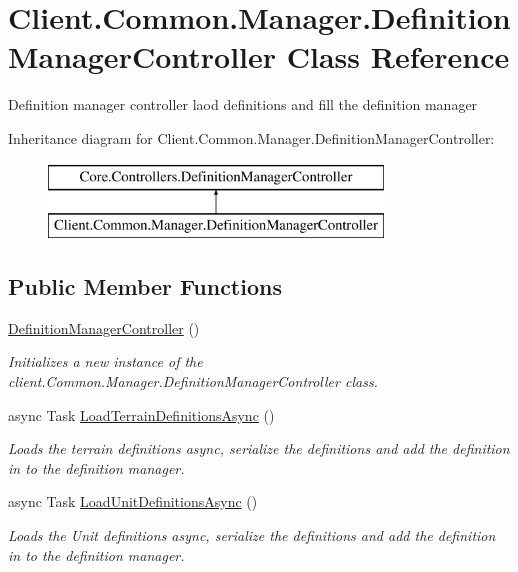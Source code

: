 \hypertarget{classClient_1_1Common_1_1Manager_1_1DefinitionManagerController}{\section{Client.\-Common.\-Manager.\-Definition\-Manager\-Controller Class Reference}
\label{classClient_1_1Common_1_1Manager_1_1DefinitionManagerController}
}


Definition manager controller laod definitions and fill the definition manager  


Inheritance diagram for Client.\-Common.\-Manager.\-Definition\-Manager\-Controller\-:\begin{figure}[H]
\begin{center}
\leavevmode
\includegraphics[height=2.000000cm]{classClient_1_1Common_1_1Manager_1_1DefinitionManagerController}
\end{center}
\end{figure}
\subsection*{Public Member Functions}
\begin{DoxyCompactItemize}
\item 
\hyperlink{classClient_1_1Common_1_1Manager_1_1DefinitionManagerController_a96a7c15eea1a7237941000f9008ab808}{Definition\-Manager\-Controller} ()
\begin{DoxyCompactList}\small\item\em Initializes a new instance of the client.\-Common.\-Manager.\-Definition\-Manager\-Controller class. \end{DoxyCompactList}\item 
async Task \hyperlink{classClient_1_1Common_1_1Manager_1_1DefinitionManagerController_aa551f263205c884e7e9255a95b3731e9}{Load\-Terrain\-Definitions\-Async} ()
\begin{DoxyCompactList}\small\item\em Loads the terrain definitions async, serialize the definitions and add the definition in to the definition manager. \end{DoxyCompactList}\item 
async Task \hyperlink{classClient_1_1Common_1_1Manager_1_1DefinitionManagerController_a4a20fe19a6a0ce7b3a1525894ddade4b}{Load\-Unit\-Definitions\-Async} ()
\begin{DoxyCompactList}\small\item\em Loads the Unit definitions async, serialize the definitions and add the definition in to the definition manager. \end{DoxyCompactList}\end{DoxyCompactItemize}
